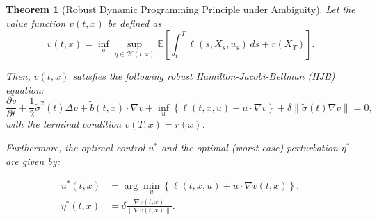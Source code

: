 \documentclass[11pt]{article}
\newtheorem{theorem}{Theorem}[section]
\def\w{\widetilde}
\begin{document}
\begin{theorem}[Robust Dynamic Programming Principle under Ambiguity]
\label{thm:robust_dpp}
Let the value function $v(t,x)$ be defined as
\begin{equation}
v(t,x) = \inf_{u} \sup_{\eta \in \mathcal{H}(t,x)} \mathbb{E}\left[ \int_t^T \ell(s, X_s, u_s) \, ds + r(X_T) \right].
\end{equation}

Then, $v(t,x)$ satisfies the following robust Hamilton-Jacobi-Bellman (HJB) equation:
\begin{equation}
\frac{\partial v}{\partial t} + \frac{1}{2}\w\sigma^2(t) \Delta v + \w b(t,x) \cdot \nabla v + \inf_{u} \left\{ \ell(t,x,u) + u \cdot \nabla v \right\} + \delta \|\w\sigma(t) \nabla v\| = 0,
\end{equation}
with the terminal condition $v(T,x) = r(x)$.

Furthermore, the optimal control $u^*$ and the optimal (worst-case) perturbation $\eta^*$ are given by:


\begin{align*}
u^*(t,x) &= \arg\min_{u} \left\{ \ell(t,x,u) + u \cdot \nabla v(t,x) \right\}, \\
\eta^*(t,x) &= \delta \frac{\nabla v(t,x)}{\|\nabla v(t,x)\|}.
\end{align*}

\end{theorem}
\end{document}
